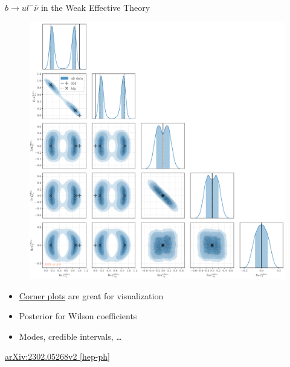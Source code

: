 \documentclass[
aspectratio=169,
14pt,
professionalfonts
]{beamer}
\newcommand{\arrow}{~\ding{220}~}
\begin{document}
\begin{frame}{$b\to u l^- \bar \nu$ in the Weak Effective Theory}
    \vspace{-0.5cm}
    \begin{minipage}{0.5\textwidth}
        \begin{figure}
            \includegraphics[width=\textwidth]{../plots/wet-posterior.png}
        \end{figure}
    \end{minipage}
    \begin{minipage}{0.49\textwidth}
        \begin{itemize}
            \item \href{https://corner.readthedocs.io/en/latest/}{Corner plots} are great for visualization
            \item Posterior for Wilson coefficients
            \item[\arrow] Modes, credible intervals, \ldots
        \end{itemize}
        \vspace{0.5cm}
        \begin{flushright}
            \small
            \href{https://arxiv.org/pdf/2302.05268}{arXiv:2302.05268v2 [hep-ph]}
        \end{flushright}
    \end{minipage}
\end{frame}
\end{document}
